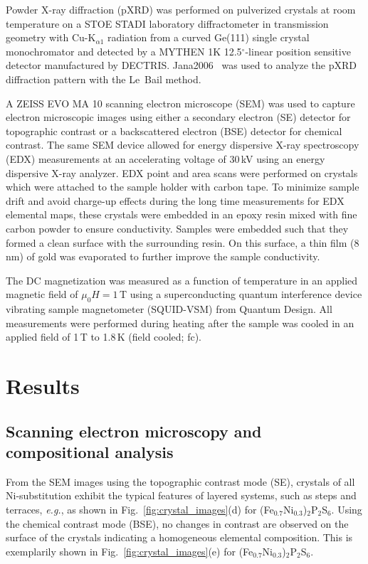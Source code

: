 \documentclass[twocolumn,superscriptaddress,prb,preprintnumbers,nobibnotes,aps]{revtex4-2}  %
\begin{document}
Powder X-ray diffraction (pXRD) was performed on pulverized crystals at room temperature on a STOE STADI laboratory diffractometer in transmission geometry with Cu-K$_{\alpha1}$ radiation from a curved Ge(111) single crystal monochromator and detected by a MYTHEN 1K 12.5$^\circ$-linear position sensitive detector manufactured by DECTRIS. Jana2006~\cite{Petricek2014} was used to analyze the pXRD diffraction pattern with the Le~Bail method.

A ZEISS EVO MA 10 scanning electron microscope (SEM) was used to capture electron microscopic images using either a secondary electron (SE) detector for topographic contrast or a backscattered electron (BSE) detector for chemical contrast. The same SEM device allowed for energy dispersive X-ray spectroscopy (EDX) measurements at an accelerating voltage of 30\,kV using an energy dispersive X-ray analyzer. EDX point and area scans were performed on crystals which were attached to the sample holder with carbon tape. To minimize sample drift and avoid charge-up effects during the long time measurements for EDX elemental maps, these crystals were embedded in an epoxy resin mixed with fine carbon powder to ensure conductivity. Samples were embedded such that they formed a clean surface with the surrounding resin. On this surface, a thin film (8\,nm) of gold was evaporated to further improve the sample conductivity.

The DC magnetization was measured as a function of temperature in an applied magnetic field of $\mu_0H = 1$\,T using a superconducting quantum interference device vibrating sample magnetometer (SQUID-VSM) from Quantum Design. All measurements were performed during heating after the sample was cooled in an applied field of 1\,T to 1.8\,K (field cooled; fc).



\section{Results}
\subsection{Scanning electron microscopy and compositional analysis}

From the SEM images using the topographic contrast mode (SE), crystals of all  Ni-substitution exhibit the typical features of layered systems, such as steps and terraces, \textit{e.g.}, as shown in Fig.~\ref{fig:crystal_images}(d) for (Fe$_{0.7}$Ni$_{0.3}$)$_2$P$_2$S$_6$. Using the chemical contrast mode (BSE), no changes in contrast are observed on the surface of the crystals indicating a homogeneous elemental composition. This is exemplarily shown in Fig.~\ref{fig:crystal_images}(e) for (Fe$_{0.7}$Ni$_{0.3}$)$_2$P$_2$S$_6$.
\end{document}
